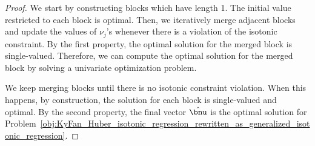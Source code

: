 \begin{proof}
We start by constructing blocks which have length 1.
The initial value restricted to each block is optimal.
Then, we iteratively merge adjacent blocks and update the values of $\nu_j$'s whenever there is a violation of the isotonic constraint.
By the first property, the optimal solution for the merged block is single-valued.
Therefore, we can compute the optimal solution for the merged block by solving a univariate optimization problem.

We keep merging blocks until there is no isotonic constraint violation.
When this happens, by construction, the solution for each block is single-valued and optimal.
By the second property, the final vector $\hat{\bnu}$ is the optimal solution for Problem~\eqref{obj:KyFan_Huber_isotonic_regression_rewritten_as_generalized_isotonic_regression}.


\end{proof}
